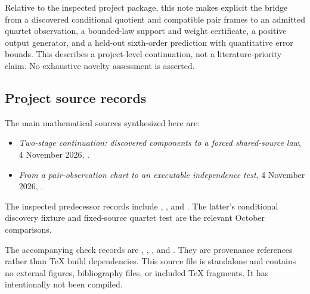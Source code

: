 \documentclass[11pt]{article}
\theoremstyle{definition}
\theoremstyle{remark}
\begin{document}
Relative to the inspected project package, this note makes explicit the
bridge from a discovered conditional quotient and compatible pair frames
to an admitted quartet observation, a bounded-law support and weight
certificate, a positive output generator, and a held-out sixth-order
prediction with quantitative error bounds. This describes a project-level
continuation, not a literature-priority claim. No exhaustive novelty
assessment is asserted.

\subsection{Project source records}

The main mathematical sources synthesized here are:
\begin{itemize}
\item \emph{Two-stage continuation: discovered components to a forced
shared-source law}, 4 November 2026,
.
\item \emph{From a pair-observation chart to an executable independence
test}, 4 November 2026,
.
\end{itemize}
The inspected predecessor records include
,
, and
.
The latter's conditional discovery fixture and fixed-source quartet test
are the relevant October comparisons.

The accompanying check records are
,
,
, and
.
They are provenance references rather than TeX build dependencies. This
source file is standalone and contains no external figures, bibliography
files, or included TeX fragments. It has intentionally not been compiled.
\end{document}
